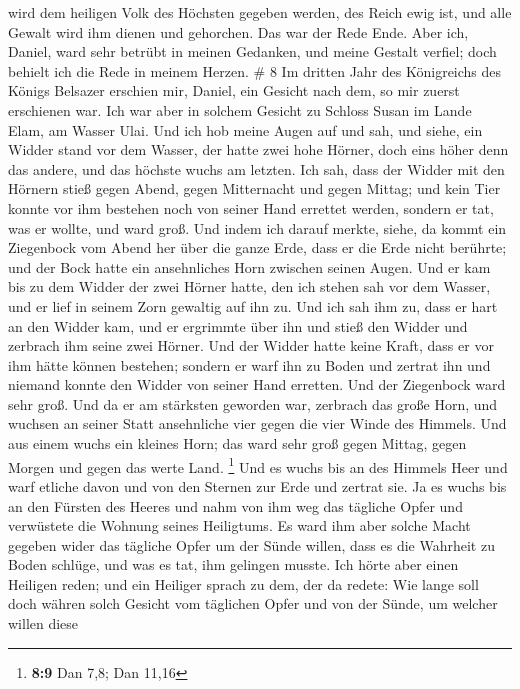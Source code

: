 wird dem heiligen Volk des Höchsten gegeben werden, des Reich ewig ist,
und alle Gewalt wird ihm dienen und gehorchen.  Das war
der Rede Ende. Aber ich, Daniel, ward sehr betrübt in meinen Gedanken,
und meine Gestalt verfiel; doch behielt ich die Rede in meinem Herzen.
\# 8  Im dritten Jahr des Königreichs des Königs Belsazer
erschien mir, Daniel, ein Gesicht nach dem, so mir zuerst erschienen
war.  Ich war aber in solchem Gesicht zu Schloss Susan im
Lande Elam, am Wasser Ulai.  Und ich hob meine Augen auf
und sah, und siehe, ein Widder stand vor dem Wasser, der hatte zwei hohe
Hörner, doch eins höher denn das andere, und das höchste wuchs am
letzten.  Ich sah, dass der Widder mit den Hörnern stieß
gegen Abend, gegen Mitternacht und gegen Mittag; und kein Tier konnte
vor ihm bestehen noch von seiner Hand errettet werden, sondern er tat,
was er wollte, und ward groß.  Und indem ich darauf
merkte, siehe, da kommt ein Ziegenbock vom Abend her über die ganze
Erde, dass er die Erde nicht berührte; und der Bock hatte ein
ansehnliches Horn zwischen seinen Augen.  Und er kam bis
zu dem Widder der zwei Hörner hatte, den ich stehen sah vor dem Wasser,
und er lief in seinem Zorn gewaltig auf ihn zu.  Und ich
sah ihm zu, dass er hart an den Widder kam, und er ergrimmte über ihn
und stieß den Widder und zerbrach ihm seine zwei Hörner. Und der Widder
hatte keine Kraft, dass er vor ihm hätte können bestehen; sondern er
warf ihn zu Boden und zertrat ihn und niemand konnte den Widder von
seiner Hand erretten.  Und der Ziegenbock ward sehr groß.
Und da er am stärksten geworden war, zerbrach das große Horn, und
wuchsen an seiner Statt ansehnliche vier gegen die vier Winde des
Himmels.  Und aus einem wuchs ein kleines Horn; das ward
sehr groß gegen Mittag, gegen Morgen und gegen das werte Land.
\footnote{\textbf{8:9} Dan 7,8; Dan 11,16}  Und es wuchs
bis an des Himmels Heer und warf etliche davon und von den Sternen zur
Erde und zertrat sie.  Ja es wuchs bis an den Fürsten des
Heeres und nahm von ihm weg das tägliche Opfer und verwüstete die
Wohnung seines Heiligtums.  Es ward ihm aber solche Macht
gegeben wider das tägliche Opfer um der Sünde willen, dass es die
Wahrheit zu Boden schlüge, und was es tat, ihm gelingen musste.
 Ich hörte aber einen Heiligen reden; und ein Heiliger
sprach zu dem, der da redete: Wie lange soll doch währen solch Gesicht
vom täglichen Opfer und von der Sünde, um welcher willen diese
